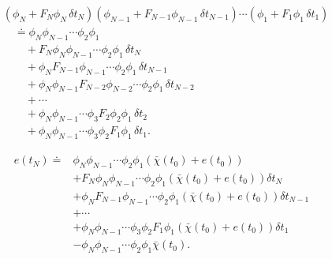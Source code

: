 \documentclass[12pt]{article}
\begin{document}
\begin{equation}
\begin{aligned}
&\left(\phi_N+F_N\phi_N\,\delta t_N\right)
 \left(\phi_{N-1}+F_{N-1}\phi_{N-1}\,\delta t_{N-1}\right)
 \cdots
 \left(\phi_1+F_1\phi_1\,\delta t_1\right)                       \\
&\quad\doteq
 \phi_N\phi_{N-1}\cdots\phi_2\phi_1                            \\
&\qquad
 +F_N\phi_N\phi_{N-1}\cdots\phi_2\phi_1\,\delta t_N          \\
&\qquad
 +\phi_NF_{N-1}\phi_{N-1}\cdots\phi_2\phi_1\,\delta t_{N-1}  \\
&\qquad
 +\phi_N\phi_{N-1}F_{N-2}\phi_{N-2}\cdots
  \phi_2\phi_1\,\delta t_{N-2}                                 \\
&\qquad
 +\cdots                                                         \\
&\qquad
 +\phi_N\phi_{N-1}\cdots\phi_3F_2\phi_2\phi_1\,\delta t_2   \\
&\qquad
 +\phi_N\phi_{N-1}\cdots\phi_3\phi_2F_1\phi_1\,\delta t_1.
\end{aligned}
\label{eq:ordered-product-expansion}
\end{equation}

\begin{equation}
\begin{aligned}
    e(t_N)
    \doteq{}&
    \phi_N\phi_{N-1}\cdots\phi_2\phi_1
    \left(\bar\chi(t_0)+e(t_0)\right)                            \\
    &+F_N\phi_N\phi_{N-1}\cdots\phi_2\phi_1
      \left(\bar\chi(t_0)+e(t_0)\right)\delta t_N                \\
    &+\phi_NF_{N-1}\phi_{N-1}\cdots\phi_2\phi_1
      \left(\bar\chi(t_0)+e(t_0)\right)\delta t_{N-1}          \\
    &+\cdots                                                     \\
    &+\phi_N\phi_{N-1}\cdots\phi_3\phi_2F_1\phi_1
      \left(\bar\chi(t_0)+e(t_0)\right)\delta t_1              \\
    &-\phi_N\phi_{N-1}\cdots\phi_2\phi_1\bar\chi(t_0).
\end{aligned}
\label{eq:error-before-cancellation}
\end{equation}
\end{document}
